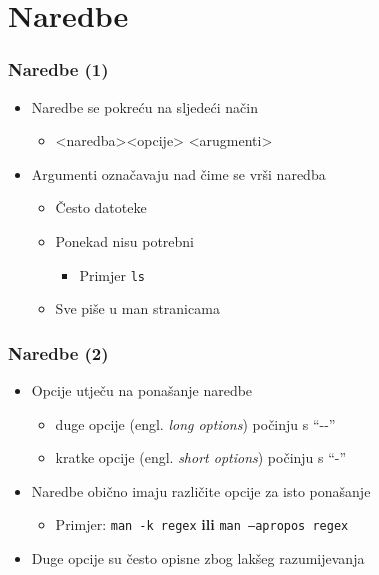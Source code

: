 \documentclass{beamer}
\begin{document}
\section{Naredbe}
\begin{frame}[t]
\frametitle{Naredbe (1)}
\begin{itemize}
  \item Naredbe se pokreću na sljedeći način
  \begin{itemize}
    \item[] \textless naredba\textgreater \textless opcije\textgreater 
          \textless arugmenti\textgreater
  \end{itemize}
  \item Argumenti označavaju nad čime se vrši naredba
  \begin{itemize}
    \item Često datoteke
    \item Ponekad nisu potrebni
    \begin{itemize}
      \item Primjer \texttt{ls}
    \end{itemize}
    \item Sve piše u man stranicama
  \end{itemize}
\end{itemize}
\end{frame}

\begin{frame}[t]
\frametitle{Naredbe (2)}
\begin{itemize}
  \item Opcije utječu na ponašanje naredbe
  \begin{itemize}
    \item duge opcije (engl. \emph{long options}) počinju s ``-{}-''  
    \item kratke opcije (engl. \emph{short options}) počinju s ``-''
  \end{itemize}
  \item Naredbe obično imaju različite opcije za isto ponašanje
  \begin{itemize}
    \item Primjer: \texttt{man -k regex} \textbf{ili}
          \texttt{man --apropos regex}
  \end{itemize}
  \item Duge opcije su često opisne zbog lakšeg razumijevanja
\end{itemize}
\end{frame}
\end{document}
